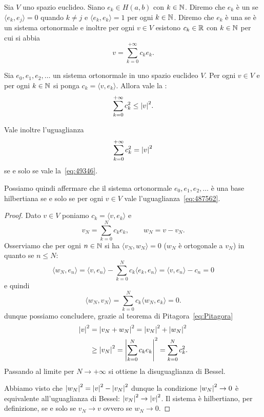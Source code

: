 \begin{definition}
Sia $V$ uno spazio euclideo. Siano $e_k\in H(a,b)$ con $k\in \mathbb N$. Diremo che
$e_k$ è un  se $\langle e_k, e_j\rangle = 0$ quando
$k\neq j$ e $\langle e_k, e_k\rangle = 1$ per ogni $k\in \mathbb N$.
Diremo che $e_k$ è una  se è un sistema ortonormale
e inoltre per ogni $v\in V$
esistono $c_k\in \mathbb R$ con $k\in\mathbb N$ per cui si abbia
\begin{equation}\label{eq:49346}
  v = \sum_{k=0}^{+\infty} c_k e_k.
\end{equation}
\end{definition}

\begin{theorem}
\label{th:bessel}%
Sia $e_0, e_1, e_2, \dots$ un sistema ortonormale in uno spazio euclideo $V$.
Per ogni $v\in V$ e per ogni $k\in \mathbb N$ si ponga $c_k = \langle v,e_k\rangle$.
Allora vale la
:
\begin{equation}\label{eq:disuguaglianza_Bessel}
\sum_{k=0}^{+\infty} c_k^2 \le {\left|v\right|}^2.
\end{equation}

Vale inoltre l'uguaglianza
\begin{equation}\label{eq:487562}
\sum_{k=0}^{+\infty} c_k^2 = {\left|v\right|}^2
\end{equation}
se e solo se vale la~\eqref{eq:49346}.

Possiamo quindi affermare che il sistema ortonormale $e_0, e_1, e_2, \dots$
è una base hilbertiana se e solo se per ogni $v\in V$ vale l'uguaglianza~\eqref{eq:487562}.
\end{theorem}
%
\begin{proof}
Dato $v\in V$ poniamo $c_k = \langle v,e_k\rangle$ e
\[
   v_N = \sum_{k=0}^N c_k e_k, \qquad w_N = v - v_N.
\]
Osserviamo che per ogni $n\in \mathbb N$ si ha $\langle v_N,w_N\rangle=0$
($w_N$ è ortogonale a $v_N$)
in quanto se $n\le N$:
\[
  \langle w_N , e_n \rangle
  = \langle v, e_n\rangle - \sum_{k=0}^N c_k \langle e_k, e_n\rangle
  = \langle v,e_n\rangle - c_n = 0
\]
e quindi
\[
 \langle w_N, v_N \rangle = \sum_{k=0}^N c_k \langle w_N, e_k\rangle = 0.
\]
dunque possiamo concludere, grazie al teorema di Pitagora~\eqref{eq:Pitagora}
\begin{align*}
  {\left|v\right|}^2
  &= {\left|v_N + w_N\right|}^2
  = {\left|v_N\right|}^2 + {\left|w_N\right|}^2 \\
  &\ge {\left|v_N\right|}^2 = {\left|\sum_{k=0}^N c_k e_k\right|}^2
  = \sum_{k=0}^N c_k^2.
\end{align*}
Passando al limite per $N\to +\infty$ si ottiene la disuguaglianza
di Bessel.

Abbiamo visto che ${\left|w_N\right|}^2 = {\left|v\right|}^2 - {\left|v_N\right|}^2$
dunque la condizione ${\left|w_N\right|}^2\to 0$ è equivalente
all'uguaglianza di Bessel: ${\left|v_N\right|}^2 \to {\left|v\right|}^2$.
Il sistema è hilbertiano, per definizione, se e solo se $v_N \to v$
ovvero se $w_N\to 0$.
\end{proof}

